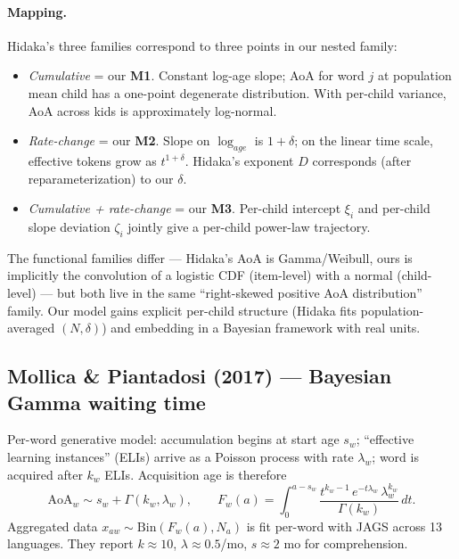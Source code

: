 \documentclass[11pt]{article}
\begin{document}
\paragraph{Mapping.} Hidaka's three families correspond to three
points in our nested family:
\begin{itemize}[leftmargin=1.3em]
\item \emph{Cumulative} = our \textbf{M1}. Constant log-age slope; AoA
  for word \(j\) at population mean child has a one-point degenerate
  distribution. With per-child variance, AoA across kids is
  approximately log-normal.
\item \emph{Rate-change} = our \textbf{M2}. Slope on \(\log_{age}\) is
  \(1 + \delta\); on the linear time scale, effective tokens grow as
  \(t^{1+\delta}\). Hidaka's exponent \(D\) corresponds (after
  reparameterization) to our \(\delta\).
\item \emph{Cumulative + rate-change} = our \textbf{M3}. Per-child
  intercept \(\xi_i\) and per-child slope deviation \(\zeta_i\) jointly
  give a per-child power-law trajectory.
\end{itemize}
The functional families differ — Hidaka's AoA is Gamma/Weibull,
ours is implicitly the convolution of a logistic CDF (item-level)
with a normal (child-level) — but both live in the same
``right-skewed positive AoA distribution'' family. Our model gains
explicit per-child structure (Hidaka fits population-averaged
\((N, \delta)\)) and embedding in a Bayesian framework with real
units.

\subsection*{Mollica \& Piantadosi (2017) — Bayesian Gamma waiting time}

Per-word generative model: accumulation begins at start age \(s_w\);
``effective learning instances'' (ELIs) arrive as a Poisson process
with rate \(\lambda_w\); word is acquired after \(k_w\) ELIs.
Acquisition age is therefore
\[
\mathrm{AoA}_w \sim s_w + \Gamma(k_w, \lambda_w),
\qquad
F_w(a) = \int_0^{a-s_w}
\frac{t^{k_w-1}\,e^{-t\lambda_w}\,\lambda_w^{k_w}}{\Gamma(k_w)}\,dt.
\]
Aggregated data \(x_{aw} \sim \mathrm{Bin}(F_w(a), N_a)\) is fit per-word
with JAGS across 13 languages. They report \(k \approx 10\),
\(\lambda \approx 0.5\)/mo, \(s \approx 2\) mo for comprehension.
\end{document}
